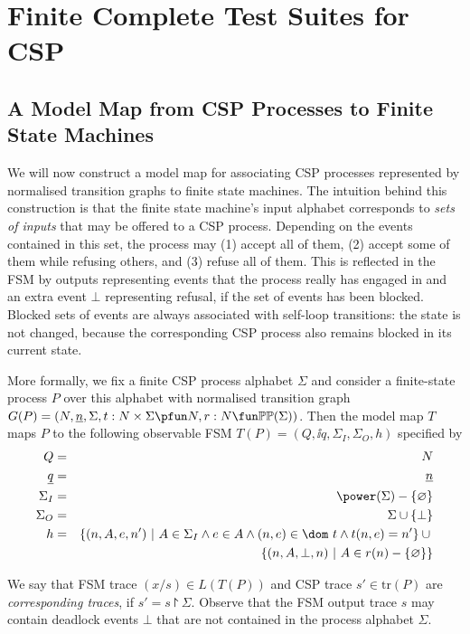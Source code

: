\section{Finite Complete Test Suites for CSP}
\label{sec:finitecomplete}
\subsection{A Model Map from CSP Processes to Finite State Machines}
\label{sec:mmap}

We will now construct a model map for associating CSP processes represented by normalised transition graphs to finite state machines. The intuition behind this 
construction is that the finite state machine's input alphabet  corresponds to
{\it sets of inputs} that may be offered to a CSP process. Depending on the events 
contained in this set, the process may (1) accept all of them, (2) accept some of them while refusing others, and (3) refuse all of them. This is reflected in the FSM
by outputs   representing events that the process really has engaged in and 
an extra event $\bot$ representing refusal, if the set of events has been blocked.
Blocked sets of events are always associated with self-loop transitions: the
state is not changed, because the corresponding CSP process also remains blocked
in its current state.

More formally, we fix a finite CSP process alphabet $\Sigma$ and consider a 
finite-state process 
$P$ over this alphabet with normalised transition graph 
$G(P)=( N, \ii n, \Sigma, t : N\times\Sigma \pfun N, r : N \fun \mathbb{P}\mathbb{P}(\Sigma))$.
 Then the model map $T$ maps $P$ to the following observable FSM $T(P) = (Q,\ii q, \Sigma_I,\Sigma_O,h)$ specified by
\begin{eqnarray*}
Q & = & N
\\
\ii q & = & \ii n
\\
\Sigma_I & = & \power(\Sigma) - \{ \varnothing \}
\\
\Sigma_O & = & \Sigma \cup \{ \bot\}
\\
h & = & \{ (n,A,e,n')~|~A\in \Sigma_I \wedge e\in A \wedge 
(n,e)\in \dom~t\wedge t(n,e) = n' \} \cup {}
\\ & & 
\{ (n,A,\bot,n)~|~A\in r(n) -\{\varnothing\}
  \}
\end{eqnarray*} 

We say that FSM trace $(x/s) \in L(T(P))$ and CSP trace $s'\in\text{tr}(P)$ are
\emph{corresponding traces}, if $s' = s\project \Sigma$. Observe that the FSM output trace $s$ may contain deadlock events $\bot$ that are not contained in the  process alphabet $\Sigma$. 


